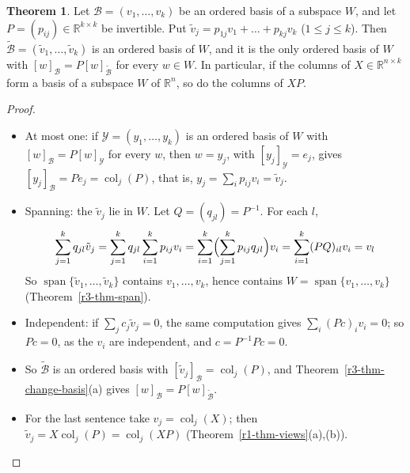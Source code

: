 \documentclass[12pt]{article}
\newcommand{\R}{\mathbb R}
\DeclareMathOperator{\col}{col}
\DeclareMathOperator{\Span}{span}
\theoremstyle{definition}
\newtheorem{theorem}{Theorem}
\begin{document}
\begin{theorem}\label{r3-thm-basis-from-P}
Let \(\mathcal B=(v_1,\dots,v_k)\) be an ordered basis of a subspace \(W\), and let
\(P=(p_{ij})\in\R^{k\times k}\) be invertible. Put \(\tilde v_j=p_{1j}v_1+\dots+p_{kj}v_k\)
(\(1\leqslant j\leqslant k\)). Then \(\tilde{\mathcal B}=(\tilde v_1,\dots,\tilde v_k)\) is an ordered
basis of \(W\), and it is the only ordered basis of \(W\) with \([w]_{\mathcal B}=P[w]_{\tilde{\mathcal B}}\)
for every \(w\in W\). In particular, if the columns of \(X\in\R^{n\times k}\) form a basis of a subspace
\(W\) of \(\R^n\), so do the columns of \(XP\).
\end{theorem}
\begin{proof}
\begin{itemize}
\item At most one: if \(\mathcal Y=(y_1,\dots,y_k)\) is an ordered basis of \(W\) with
\([w]_{\mathcal B}=P[w]_{\mathcal Y}\) for every \(w\), then \(w=y_j\), with \([y_j]_{\mathcal Y}=e_j\),
gives \([y_j]_{\mathcal B}=Pe_j=\col_j(P)\), that is, \(y_j=\sum_ip_{ij}v_i=\tilde v_j\).
\item Spanning: the \(\tilde v_j\) lie in \(W\). Let \(Q=(q_{jl})=P^{-1}\). For each \(l\),
\[
\sum_{j=1}^kq_{jl}\tilde v_j=\sum_{j=1}^kq_{jl}\sum_{i=1}^kp_{ij}v_i
=\sum_{i=1}^k\Bigl(\sum_{j=1}^kp_{ij}q_{jl}\Bigr)v_i=\sum_{i=1}^k(PQ)_{il}v_i=v_l
\]
So \(\Span\{\tilde v_1,\dots,\tilde v_k\}\) contains \(v_1,\dots,v_k\), hence contains
\(W=\Span\{v_1,\dots,v_k\}\) (Theorem~\ref{r3-thm-span}).
\item Independent: if \(\sum_jc_j\tilde v_j=0\), the same computation gives \(\sum_i(Pc)_iv_i=0\); so
\(Pc=0\), as the \(v_i\) are independent, and \(c=P^{-1}Pc=0\).
\item So \(\tilde{\mathcal B}\) is an ordered basis with \([\tilde v_j]_{\mathcal B}=\col_j(P)\), and
Theorem~\ref{r3-thm-change-basis}(a) gives \([w]_{\mathcal B}=P[w]_{\tilde{\mathcal B}}\).
\item For the last sentence take \(v_j=\col_j(X)\); then \(\tilde v_j=X\col_j(P)=\col_j(XP)\)
(Theorem~\ref{r1-thm-views}(a),(b)).\qedhere
\end{itemize}
\end{proof}
\end{document}
